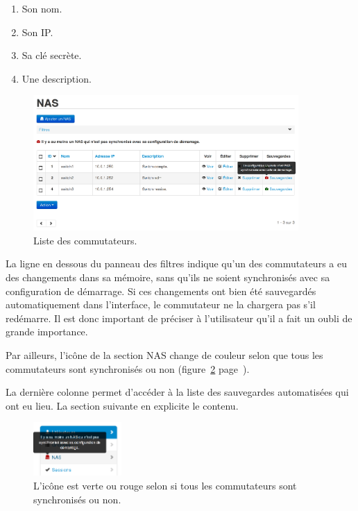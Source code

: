 \begin{enumerate}
\item Son nom.
\item Son IP.
\item Sa clé secrète.
\item Une description.
\end{enumerate}

\begin{figure}[!h]
	\begin{center}
	    \includegraphics[width=0.9\textwidth]{img/nas.png}
	\end{center}
	\caption{Liste des commutateurs.}
	\label{nas}
\end{figure}

La ligne en dessous du panneau des filtres indique qu'un des commutateurs a eu des changements dans sa mémoire, sans qu'ils ne soient synchronisés avec sa configuration de démarrage. Si ces changements ont bien été sauvegardés automatiquement dans l'interface, le commutateur ne la chargera pas s'il redémarre. Il est donc important de préciser à l'utilisateur qu'il a fait un oubli de grande importance.

Par ailleurs, l'icône de la section NAS change de couleur selon que tous les commutateurs sont synchronisés ou non (figure~\ref{menunas} page~\pageref{menunas}).

La dernière colonne permet d'accéder à la liste des sauvegardes automatisées qui ont eu lieu. La section suivante en explicite le contenu.

\begin{figure}[!h]
	\begin{center}
	    \includegraphics[width=0.3\textwidth]{img/menunas.png}
	\end{center}
	\caption{L'icône est verte ou rouge selon si tous les commutateurs sont synchronisés ou non.}
	\label{menunas}
\end{figure}


